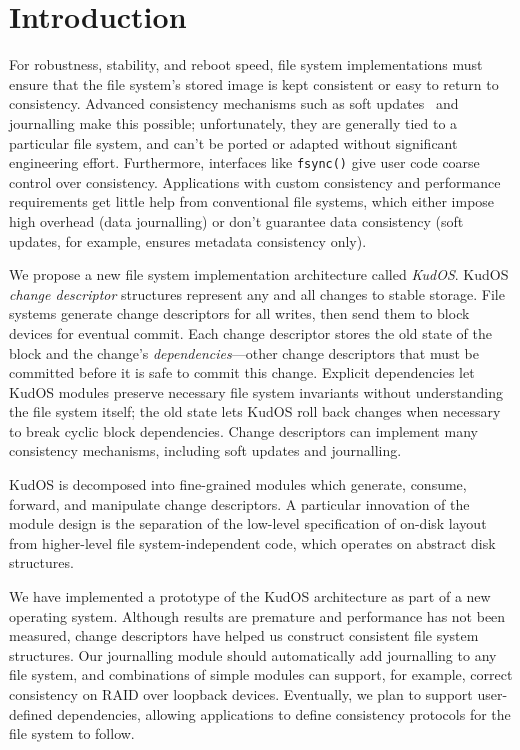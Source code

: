 
\section*{Introduction}
\label{sec:intro}

For robustness, stability, and reboot speed, file system implementations
must ensure that the file system's stored image is kept consistent
or easy to return to consistency.
%
Advanced consistency mechanisms such as soft updates~\cite{ganger00soft}
and journalling make this possible; unfortunately,
%
they are generally tied to a particular file system, and
can't be ported or adapted without significant engineering
effort.
%
Furthermore, interfaces like \verb+fsync()+ give user code coarse control
over consistency.
%
Applications with custom consistency and performance requirements get
little help from conventional file systems, which either impose high
overhead (data journalling) or don't guarantee data consistency (soft
updates, for example, ensures metadata consistency only).



We propose a new file system implementation architecture called
\emph{KudOS}.
%
KudOS \emph{change descriptor} structures represent any and all changes to
stable storage.
%
File systems generate change descriptors for all writes, then
send them to block devices for eventual commit.
%
Each change descriptor stores the old state of the block and the change's
\emph{dependencies}---other change descriptors that must be committed before
it is safe to commit this change.
%
Explicit dependencies let KudOS modules preserve necessary file system
invariants without understanding the file system itself; the old state
lets KudOS roll back changes when necessary to break cyclic block dependencies.
%
Change descriptors can implement many
consistency mechanisms, including soft updates and journalling.

KudOS is decomposed into fine-grained modules which generate, consume,
forward, and manipulate change descriptors. A particular innovation of the
module design is the separation of the low-level specification of on-disk layout
from higher-level file system-independent code, which operates on abstract disk
structures.

We have implemented a prototype of the KudOS
architecture as part of a new operating system.
%
Although results are premature and performance has not been measured,
change descriptors have helped us construct consistent file
system structures.
%
Our journalling module should automatically add journalling to any file
system, and combinations of simple modules can support, for example,
correct consistency on RAID over loopback devices.
%
Eventually, we plan to support user-defined dependencies,
allowing applications to define consistency protocols for the file system
to follow.


